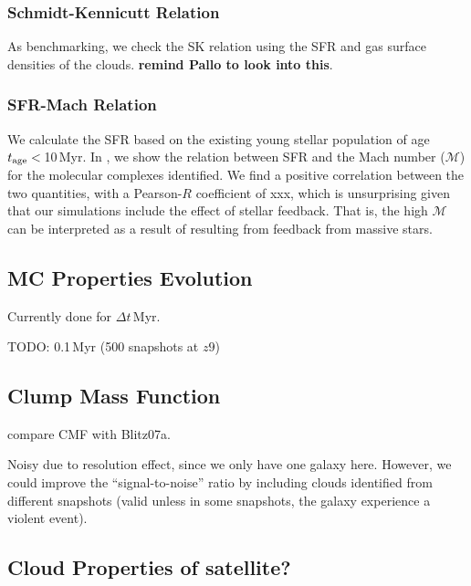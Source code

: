 \documentclass[apj]{emulateapj} %
\begin{document}

\subsubsection{Schmidt-Kennicutt Relation}
As benchmarking, we check the SK relation using the SFR and gas surface densities of the clouds. {\bf remind Pallo to look into this}.


\subsubsection{SFR-Mach Relation}

We calculate the SFR based on the existing young stellar population of age $t_{\rm age}<$\,10\,Myr.
In \Fig{}, we show the relation between SFR and the Mach number ($\mathcal{M}$) for the molecular 
complexes identified. 
We find a positive correlation between the two quantities, with a Pearson-$R$ coefficient of xxx, 
which is unsurprising given that our simulations include the effect of stellar feedback. That is, 
the high $\mathcal{M}$ can be interpreted as a result of \SF resulting from feedback from 
massive stars.

\subsection{MC Properties Evolution}
Currently done for $\Delta t$\,Myr. 

TODO: 0.1\,Myr (500 snapshots at $z$\eq$9$)


\subsection{Clump Mass Function}
compare CMF with Blitz07a.

Noisy due to resolution effect, since we only have one galaxy here. However, 
we could improve the ``signal-to-noise'' ratio by including clouds identified from different 
snapshots (valid unless in some snapshots, the galaxy experience a violent event).





\subsection{Cloud Properties of satellite?}
\end{document}
